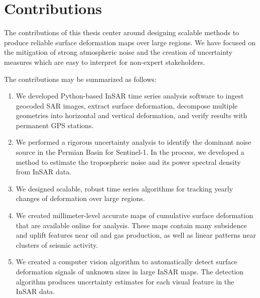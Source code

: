 

\section{Contributions}
\label{sec:chap1-contributions}


The contributions of this thesis center around designing scalable methods to produce reliable surface deformation maps over large regions. We have focused on the mitigation of strong atmospheric noise and the creation of uncertainty measures which are easy to interpret for non-expert stakeholders.


The contributions may be summarized as follows:

\begin{enumerate}
	
	\item We developed Python-based InSAR time series analysis software to ingest geocoded SAR images, extract surface deformation, decompose multiple geometries into horizontal and vertical deformation, and verify results with permanent GPS stations.
	
	\item We performed a rigorous uncertainty analysis to identify the dominant noise source in the Permian Basin for Sentinel-1.  In the process, we developed a method to estimate the tropospheric noise and its power spectral density from InSAR data.
	
	\item We designed scalable, robust time series algorithms for tracking yearly changes of deformation over large regions.
	
	\item We created millimeter-level accurate maps of cumulative surface deformation that are available online for analysis. These maps contain many subsidence and uplift features near oil and gas production, as well as linear patterns near clusters of seismic activity.
	
	\item We created a computer vision algorithm to automatically detect surface deformation signals of unknown sizes in large InSAR maps. The detection algorithm produces uncertainty estimates for each visual feature in the InSAR data.
	
	
	
\end{enumerate}


